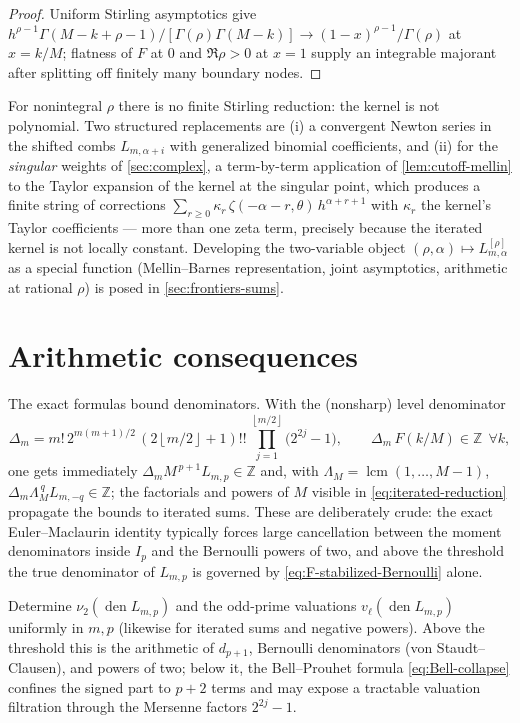 \documentclass[11pt,oneside]{article}
\numberwithin{equation}{section}
\theoremstyle{definition}
\theoremstyle{remark}
\newcommand{\Z}{\mathbb Z}
\newcommand{\vtwo}{\nu_2}
\newcommand{\floor}[1]{\left\lfloor #1\right\rfloor}
\begin{document}
\begin{proof}
Uniform Stirling asymptotics give
$h^{\rho-1}\Gamma(M-k+\rho-1)/[\Gamma(\rho)\Gamma(M-k)]
\to(1-x)^{\rho-1}/\Gamma(\rho)$ at $x=k/M$; flatness of $F$ at $0$
and $\Re\rho>0$ at $x=1$ supply an integrable majorant after
splitting off finitely many boundary nodes.
\end{proof}

For nonintegral $\rho$ there is no finite Stirling reduction: the
kernel is not polynomial.  Two structured replacements are (i) a
convergent Newton series in the shifted combs $L_{m,\alpha+i}$ with
generalized binomial coefficients, and (ii) for the \emph{singular}
weights of \cref{sec:complex}, a term-by-term application of
\cref{lem:cutoff-mellin} to the Taylor expansion of the kernel at the
singular point, which produces a finite string of corrections
$\sum_{r\ge0}\kappa_r\,\zeta(-\alpha-r,\theta)\,h^{\alpha+r+1}$ with
$\kappa_r$ the kernel's Taylor coefficients --- more than one zeta
term, precisely because the iterated kernel is not locally constant.
Developing the two-variable object
$(\rho,\alpha)\mapsto L^{[\rho]}_{m,\alpha}$ as a special function
(Mellin--Barnes representation, joint asymptotics, arithmetic at
rational $\rho$) is posed in \cref{sec:frontiers-sums}.

\section{Arithmetic consequences}
\label{sec:arithmetic-sums}

The exact formulas bound denominators.  With the (nonsharp) level
denominator
\begin{equation}
 \Delta_m
 =m!\,2^{m(m+1)/2}\,
 (2\floor{m/2}+1)!!\,
 \prod_{j=1}^{\floor{m/2}}\bigl(2^{2j}-1\bigr),
 \qquad
 \Delta_m\,F(k/M)\in\Z\ \ \forall k,
 \label{eq:DeltaN}
\end{equation}
one gets immediately $\Delta_mM^{\,p+1}L_{m,p}\in\Z$ and, with
$\Lambda_M=\operatorname{lcm}(1,\dots,M-1)$,
$\Delta_m\Lambda_M^{\,q}L_{m,-q}\in\Z$; the factorials and powers of
$M$ visible in \eqref{eq:iterated-reduction} propagate the bounds to
iterated sums.  These are deliberately crude: the exact
Euler--Maclaurin identity typically forces large cancellation between
the moment denominators inside $I_p$ and the Bernoulli powers of two,
and above the threshold the true denominator of $L_{m,p}$ is governed
by \eqref{eq:F-stabilized-Bernoulli} alone.

\begin{problem}
\label{prob:sharp-valuations}
Determine $\vtwo(\operatorname{den}L_{m,p})$ and the odd-prime
valuations $v_\ell(\operatorname{den}L_{m,p})$ uniformly in $m,p$
(likewise for iterated sums and negative powers).  Above the
threshold this is the arithmetic of $d_{p+1}$, Bernoulli
denominators (von Staudt--Clausen), and powers of two; below it, the
Bell--Prouhet formula \eqref{eq:Bell-collapse} confines the signed
part to $p+2$ terms and may expose a tractable valuation filtration
through the Mersenne factors $2^{2j}-1$.
\end{problem}
\end{document}
